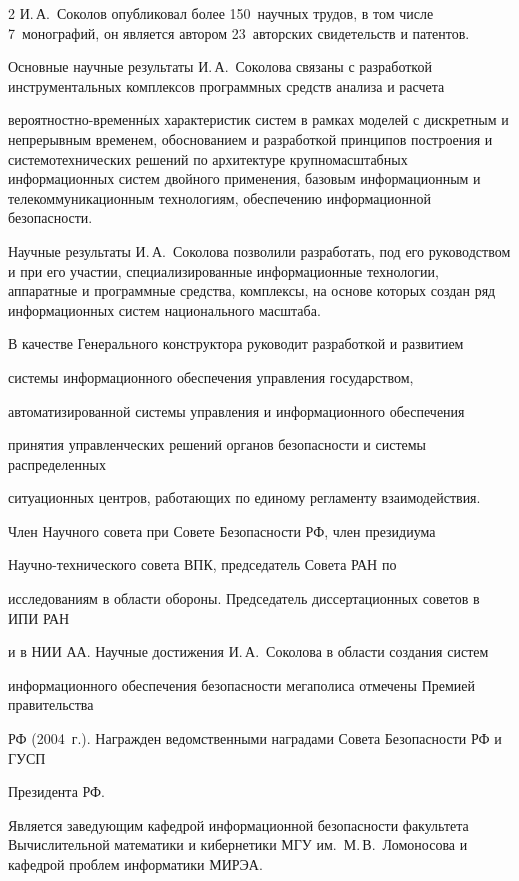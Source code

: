 \begin{multicols}{2}
И.\,А.~Соколов опубликовал более 150~научных трудов, в том числе 7~монографий, он является автором 23~авторских свидетельств и патентов.



Основные научные результаты И.\,А.~Соколова связаны с разработкой инструментальных комплексов программных средств анализа и расчета

вероятностно-временн$\acute{\mbox{ы}}$х характеристик систем в рамках моделей с дискретным и непрерывным временем, обоснованием и разработкой принципов построения и системотехнических решений по архитектуре крупномасштабных информационных систем двойного применения, базовым информационным и телекоммуникационным технологиям, обеспечению информационной безопасности.



Научные результаты И.\,А.~Соколова позволили разработать, под его руководством и при его участии, специализированные информационные технологии, аппаратные и программные средства, комплексы, на основе которых создан ряд информационных систем национального масштаба.



В качестве Генерального конструктора руководит разработкой и развитием

системы информа\-ци\-онного обеспечения управления государством,

автоматизированной сис\-те\-мы управ\-ле\-ния и информационного обеспечения

принятия управленческих решений органов безопасности и системы распределенных

ситуационных центров, работа\-ющих по единому регламенту взаимодействия.

Член Научного совета при Совете Безопасности РФ, член президиума

На\-уч\-но-тех\-ни\-че\-ско\-го совета ВПК, председатель Совета РАН по

исследованиям в области обороны. Председатель диссертационных советов в ИПИ РАН

и в НИИ АА. Научные достижения И.\,А.~Соколова в области создания сис\-тем

информационного обеспечения безопасности мегаполиса отмечены Премией правительства

РФ (2004~г.). Награжден ведомственными наградами Совета Безопасности РФ и ГУСП

 Президента РФ.



Является заведующим кафедрой информационной безопасности факультета Вычислительной математики и кибернетики МГУ им.\ М.\,В.~Ломоносова и кафедрой проблем информатики МИРЭА.




\end{multicols}
